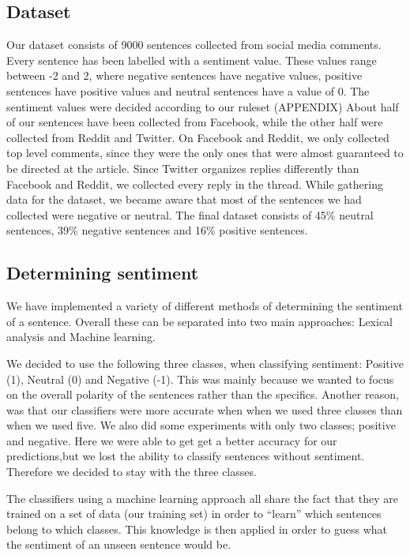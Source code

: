 \subsection{Dataset}
Our dataset consists of 9000 sentences collected from social media comments. Every sentence has been labelled with a sentiment value. These values range between -2 and 2, where negative sentences have negative values, positive sentences have positive values and neutral sentences have a value of 0.
The sentiment values were decided according to our ruleset (APPENDIX)
About half of our sentences have been collected from Facebook, while the other half were collected from Reddit and Twitter. On Facebook and Reddit, we only collected top level comments, since they were the only ones that were almost guaranteed to be directed at the article. Since Twitter organizes replies differently than Facebook and Reddit, we collected every reply in the thread.
While gathering data for the dataset, we became aware that most of the sentences we had collected were negative or neutral. The final dataset consists of 45\% neutral sentences, 39\% negative sentences and 16\% positive sentences. 

\subsection{Determining sentiment}
We have implemented a variety of different methods of determining the sentiment of a sentence. Overall these can be separated into two main approaches: Lexical analysis and Machine learning. 

We decided to use the following three classes, when classifying sentiment: Positive (1), Neutral (0) and Negative (-1). This was mainly because we wanted to focus on the overall polarity of the sentences rather than the specifics. Another reason, was that our classifiers were more accurate when when we used three classes than when we used five.
We also did some experiments with only two classes; positive and negative. Here we were able to get get a better accuracy for our predictions,but we lost the ability to classify sentences without sentiment. Therefore we decided to stay with the three classes.

The classifiers using a machine learning approach all share the fact that they are trained on a set of data (our training set) in order to “learn” which sentences belong to which classes. This knowledge is then applied in order to guess what the sentiment of an unseen sentence would be. 
